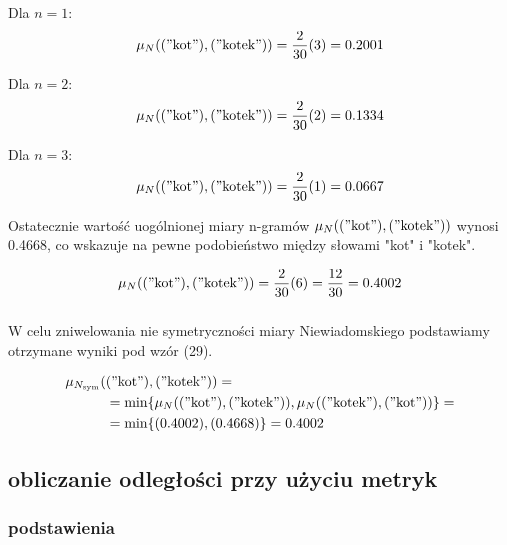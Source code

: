 \documentclass{article}
\begin{document}
Dla $n = 1$:
\begin{equation}
    \mu_N(("\text{kot}"), ("\text{kotek}")) = \frac{2}{30} (3) = 0.2001
\end{equation}

Dla $n = 2$:
\begin{equation}
    \mu_N(("\text{kot}"), ("\text{kotek}")) = \frac{2}{30} (2) = 0.1334
\end{equation}

Dla $n = 3$:
\begin{equation}
    \mu_N(("\text{kot}"), ("\text{kotek}")) = \frac{2}{30} (1) = 0.0667
\end{equation}

\noindent Ostatecznie wartość uogólnionej miary n-gramów \( \mu_N(("\text{kot}"), ("\text{kotek}")) \) wynosi 0.4668, co wskazuje na pewne podobieństwo między słowami "kot" i "kotek". \newline

\begin{equation}
    \mu_N(("\text{kot}"), ("\text{kotek}")) = \frac{2}{30} (6) = \frac{12}{30} = 0.4002
\end{equation}

\subsubsection*{}

\noindent W celu zniwelowania nie symetryczności miary Niewiadomskiego podstawiamy otrzymane wyniki pod wzór (29).


\begin{equation} \label{eq1}
\begin{split}
\mu_{N_{\text{sym}}}(&("\text{kot}"), ("\text{kotek}")) = \\
& = \min\{\mu_N (("\text{kot}"), ("\text{kotek}")), \mu_N (("\text{kotek}"), ("\text{kot}"))\} = \\
& = \min\{(0.4002), (0.4668)\} = 0.4002
\end{split}
\end{equation}





\subsection*{obliczanie odległości przy użyciu metryk}

\subsubsection*{podstawienia}
\end{document}
